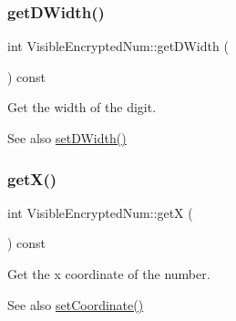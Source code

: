 \mbox{\label{class_visible_encrypted_num_a252dfa8c0add8c6fa244bdd835f7eed6}} 
\subsubsection{\texorpdfstring{get\+D\+Width()}{getDWidth()}}
{\footnotesize\ttfamily int Visible\+Encrypted\+Num\+::get\+D\+Width (\begin{DoxyParamCaption}{ }\end{DoxyParamCaption}) const\hspace{0.3cm}{\ttfamily [virtual]}}



Get the width of the digit. 

\begin{DoxySeeAlso}{See also}
\mbox{\hyperlink{class_visible_encrypted_num_a914e70f40d7344355a343dc3db6cba1e}{set\+D\+Width()}} 
\end{DoxySeeAlso}
\mbox{\label{class_visible_encrypted_num_a86bf5a8a6fe1532c3575c4cc7f1e20a0}} 
\subsubsection{\texorpdfstring{get\+X()}{getX()}}
{\footnotesize\ttfamily int Visible\+Encrypted\+Num\+::getX (\begin{DoxyParamCaption}{ }\end{DoxyParamCaption}) const\hspace{0.3cm}{\ttfamily [virtual]}}



Get the x coordinate of the number. 

\begin{DoxySeeAlso}{See also}
\mbox{\hyperlink{class_visible_encrypted_num_a79b010bfd2b90f1c0398a4ccfed80912}{set\+Coordinate()}} 
\end{DoxySeeAlso}
\mbox{\label{class_visible_encrypted_num_a9ee9f0f402141ca4d4692b8470a76ba0}} 
